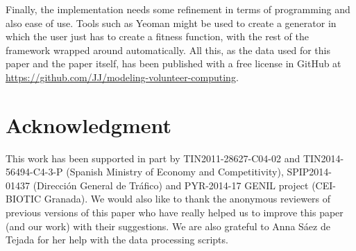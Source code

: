 \documentclass[journal,onecolumn]{IEEEtran}
\begin{document}
Finally, the implementation needs some refinement in terms of
programming and also ease of use. Tools such as Yeoman might be used
to create a generator in which the user just has to create a fitness
function, with the rest of the framework wrapped around
automatically. All this, as the data used for this paper and the paper
itself, has been published with a free license in GitHub at
\url{https://github.com/JJ/modeling-volunteer-computing}.  

\section*{Acknowledgment}

This work has been supported in part by TIN2011-28627-C04-02 and
TIN2014-56494-C4-3-P (Spanish Ministry of Economy and Competitivity),
SPIP2014-01437 (Direcci{\'o}n General de Tr{\'a}fico) and PYR-2014-17
GENIL project (CEI-BIOTIC Granada). We would also like to thank the
anonymous reviewers of previous versions of this paper who have really
helped us to improve 
this paper (and our work) with their suggestions. We are also grateful
to Anna S\'aez de Tejada for her help with the data processing scripts.



\end{document}
